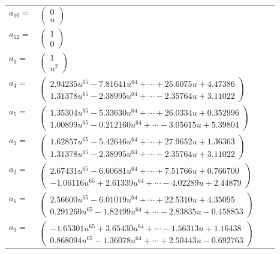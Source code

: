 \documentclass[1p]{elsarticle_modified}
\theoremstyle{definition}
\begin{document}
\begin{tabular}{m{7pt} m{180pt} m{7pt} m{180pt} }
\flushright $a_{10}=$&$\begin{pmatrix}0\\u\end{pmatrix}$ \\
\flushright $a_{12}=$&$\begin{pmatrix}1\\0\end{pmatrix}$ \\
\flushright $a_{1}=$&$\begin{pmatrix}1\\u^2\end{pmatrix}$ \\
\flushright $a_{4}=$&$\begin{pmatrix}2.94235 u^{65}-7.81641 u^{64}+\cdots+25.6075 u+4.47386\\1.31378 u^{65}-2.38995 u^{64}+\cdots-2.35764 u+3.11022\end{pmatrix}$ \\
\flushright $a_{5}=$&$\begin{pmatrix}1.35304 u^{65}-5.33630 u^{64}+\cdots+26.0334 u+0.352996\\1.00899 u^{65}-0.212160 u^{64}+\cdots-3.05615 u+5.39804\end{pmatrix}$ \\
\flushright $a_{3}=$&$\begin{pmatrix}1.62857 u^{65}-5.42646 u^{64}+\cdots+27.9652 u+1.36363\\1.31378 u^{65}-2.38995 u^{64}+\cdots-2.35764 u+3.11022\end{pmatrix}$ \\
\flushright $a_{2}=$&$\begin{pmatrix}2.67431 u^{65}-6.60681 u^{64}+\cdots+7.51766 u+0.766700\\-1.06116 u^{65}+2.61339 u^{64}+\cdots-4.02289 u+2.44879\end{pmatrix}$ \\
\flushright $a_{6}=$&$\begin{pmatrix}2.56600 u^{65}-6.01019 u^{64}+\cdots+22.5310 u+4.35095\\0.291260 u^{65}-1.82499 u^{64}+\cdots-2.83835 u-0.458853\end{pmatrix}$ \\
\flushright $a_{9}=$&$\begin{pmatrix}-1.65301 u^{65}+3.65430 u^{64}+\cdots-1.56313 u+1.16438\\0.868094 u^{65}-1.36078 u^{64}+\cdots+2.50443 u-0.692763\end{pmatrix}$ \\

\end{tabular}
\end{document}
